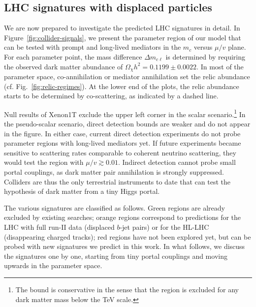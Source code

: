 \documentclass[nofootinbib,prd,aps,superscriptaddress,preprintnumbers]{revtex4}
\begin{document}
\subsection{LHC signatures with displaced particles}
%
\noindent
We are now prepared to investigate the predicted LHC signatures in detail. In Figure~\ref{fig:collider-signals}, we present the parameter region of our model that can be tested with prompt and long-lived mediators in the $m_c$ versus $\mu/v$ plane. For each parameter point, the mass difference $\Delta m_{c\ell}$ is determined by requiring the observed dark matter abundance of $\Omega_\chi h^2 = 0.1199\pm 0.0022$. In most of the parameter space, co-annihilation or mediator annihilation set the relic abundance (cf. Fig.~\ref{fig:relic-regimes}). At the lower end of the plots, the relic abundance starts to be determined by co-scattering, as indicated by a dashed line.

Null results of Xenon1T exclude the upper left corner in the scalar scenario.\footnote{The bound is conservative in the sense that the region is excluded for any dark matter mass below the TeV scale.} In the pseudo-scalar scenario, direct detection bounds are weaker and do not appear in the figure. In either case, current direct detection experiments do not probe parameter regions with long-lived mediators yet. If future experiments became sensitive to scattering rates comparable to coherent neutrino scattering, they would test the region with $\mu/v \gtrsim 0.01$. Indirect detection cannot probe small portal couplings, as dark matter pair annihilation is strongly suppressed. Colliders are thus the only terrestrial instruments to date that can test the hypothesis of dark matter from a tiny Higgs portal.

The various signatures are classified as follows. Green regions are already excluded by existing searches; orange regions correspond to predictions for the LHC with full run-II data (displaced $b$-jet pairs) or for the HL-LHC (disappearing charged tracks); red regions have not been explored yet, but can be probed with new signatures we predict in this work. In what follows, we discuss the signatures one by one, starting from tiny portal couplings and moving upwards in the parameter space.
\end{document}
